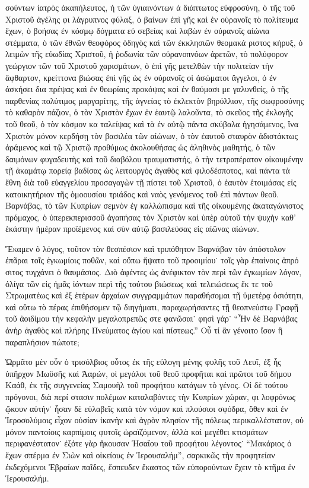 σούντων ἰατρὸς ἀκαπήλευτος, ἡ τῶν ὑγιαινόντων ἀ%
διάπτωτος εὐφροσύνη, ὁ τῆς τοῦ Χριστοῦ ἀγέλης φι%
λάγρυπνος φύλαξ, ὁ βαίνων ἐπὶ γῆς καὶ ἐν οὐρανοῖς
τὸ πολίτευμα ἔχων, ὁ βοήσας ἐν κόσμῳ δόγματα εὐ%
σεβείας καὶ λαβὼν ἐν οὐρανοῖς αἰώνια στέμματα, ὁ τῶν
ἐθνῶν θεοφόρος ὁδηγὸς καὶ τῶν ἐκκλησιῶν θεομακά%
ριστος κήρυξ, ὁ λειμὼν τῆς εὐωδίας Χριστοῦ, ἡ ῥοδωνία
τῶν οὐρανοπνόων ἀρετῶν, τὸ πολύφορον γεώργιον τῶν
τοῦ Χριστοῦ χαρισμάτων, ὁ ἐπὶ γῆς μετελθὼν τὴν
πολιτείαν τὴν ἄφθαρτον, κρείττονα βιώσας ἐπὶ γῆς ὡς
ἐν οὐρανοῖς οἱ ἀσώματοι ἄγγελοι, ὁ ἐν ἀσκήσει δια%
πρέψας καὶ ἐν θεωρίαις προκόψας καὶ ἐν θαύμασι με%
γαλυνθείς, ὁ τῆς παρθενίας πολύτιμος μαργαρίτης, τῆς
ἁγνείας τὸ ἐκλεκτὸν βηρύλλιον, τῆς σωφροσύνης τὸ
καθαρὸν πάζιον, ὁ τὸν Χριστὸν ἔχων ἐν ἑαυτῷ λαλοῦντα,
τὸ σκεῦος τῆς ἐκλογῆς τοῦ θεοῦ, ὁ τὸν κόσμον κα%
ταλείψας καὶ τὰ ἐν αὐτῷ πάντα σκύβαλα ἡγησάμενος,
ἵνα Χριστὸν μόνον κερδήσῃ τὸν βασιλέα τῶν αἰώνων,
ὁ τὸν ἑαυτοῦ σταυρὸν ἀδιστάκτως ἀράμενος καὶ τῷ
Χριστῷ προθύμως ἀκολουθήσας ὡς ἀληθινὸς μαθητής, ὁ
τῶν δαιμόνων φυγαδευτὴς καὶ τοῦ διαβόλου τραυματιστής,
ὁ τὴν τετραπέρατον οἰκουμένην τῇ ἀκαμάτῳ πορείᾳ
βαδίσας ὡς λειτουργὸς ἀγαθὸς καὶ φιλοδέσποτος, καὶ
πάντα τὰ ἔθνη διὰ τοῦ εὐαγγελίου προσαγαγὼν τῇ
πίστει τοῦ Χριστοῦ, ὁ ἑαυτὸν ἑτοιμάσας εἰς κατοικητήριον
τῆς ὁμοουσίου τριάδος καὶ ναὸς γενόμενος τοῦ ἐπὶ
πάντων θεοῦ. Βαρνάβας, τὸ τῶν Κυπρίων σεμνὸν ἐγ%
καλλώπισμα καὶ τῆς οἰκουμένης ἀκαταγώνιστος πρόμαχος,
ὁ ὑπερεκπερισσοῦ ἀγαπήσας τὸν Χριστὸν καὶ ὑπὲρ αὐτοῦ
τὴν ψυχὴν καθ’ ἑκάστην ἡμέραν προϊέμενος καὶ σὺν
αὐτῷ βασιλεύσας εἰς αἰῶνας αἰώνων.
  
  Ἔκαμεν ὁ λόγος, τοῦτον τὸν θεσπέσιον καὶ τριπόθητον
Βαρνάβαν τὸν ἀπόστολον ἐπᾶραι τοῖς ἐγκωμίοις ποθῶν,
καὶ οὔπω ἥψατο τοῦ προοιμίου˙ τοῖς γὰρ ἐπαίνοις ἀπρό%
σιτος τυγχάνει ὁ θαυμάσιος. Διὸ ἀφέντες ὡς ἀνέφικτον
τὸν περὶ τῶν ἐγκωμίων λόγον, ὀλίγα τῶν εἰς ἡμᾶς
ἰόντων περὶ τῆς τούτου βιώσεως καὶ τελειώσεως ἔκ τε
τοῦ Στρωματέως καὶ ἐξ ἑτέρων ἀρχαίων συγγραμμάτων
παραθήσομαι τῇ ὑμετέρᾳ ὁσιότητι, καὶ οὕτω τὸ πέρας
ἐπιθήσομεν τῷ διηγήματι, παραχωρήσαντες τῇ θεοπνεύστῳ
Γραφῇ τοῦ ἀοιδίμου τὴν κεφαλὴν μεγαλοπρεπῶς στε%
φανῶσαι˙ φησὶ γάρ˙ “Ἦν δὲ Βαρνάβας ἀνὴρ ἀγαθὸς καὶ
πλήρης Πνεύματος ἁγίου καὶ πίστεως.” Οὗ τί ἂν γένοιτο
ἴσον ἢ παραπλήσιον πώποτε;

\saut


Ὡρμᾶτο μὲν οὖν ὁ τρισόλβιος οὗτος ἐκ τῆς εὐλογη%
μένης φυλῆς τοῦ Λευΐ, ἐξ ἧς ὑπῆρχον Μωϋσῆς καὶ
Ἀαρών, οἱ μεγάλοι τοῦ θεοῦ προφῆται καὶ πρῶτοι τοῦ
δήμου Καάθ, ἐκ τῆς συγγενείας Σαμουὴλ τοῦ προφήτου
κατάγων τὸ γένος. Οἱ δὲ τούτου πρόγονοι, διὰ περί%
στασιν πολέμων καταλαβόντες τὴν Κυπρίων χώραν, φι%
λοφρόνως ᾤκουν αὐτήν˙ ἦσαν δὲ εὐλαβεῖς κατὰ τὸν
νόμον καὶ πλούσιοι σφόδρα, ὅθεν καὶ ἐν Ἱεροσολύμοις
εἶχον οὐσίαν ἱκανὴν καὶ ἀγρὸν πλησίον τῆς πόλεως
περικαλλέστατον, οὐ μόνον παντοίοις καρπίμοις φυτοῖς
ὡραϊζόμενον, ἀλλὰ καὶ μεγέθει κτισμάτων περιφανέστατον˙
ἐξότε γὰρ ἤκουσαν Ἡσαΐου τοῦ προφήτου λέγοντος˙
\enquote{Μακάριος ὁ ἔχων σπέρμα ἐν Σιὼν καὶ οἰκείους ἐν
Ἱερουσαλήμ}, σαρκικῶς τὴν προφητείαν ἐκδεχόμενοι
Ἑβραίων παῖδες, ἔσπευδεν ἕκαστος τῶν εὐπορούντων
ἔχειν τὸ κτῆμα ἐν Ἱερουσαλήμ.

